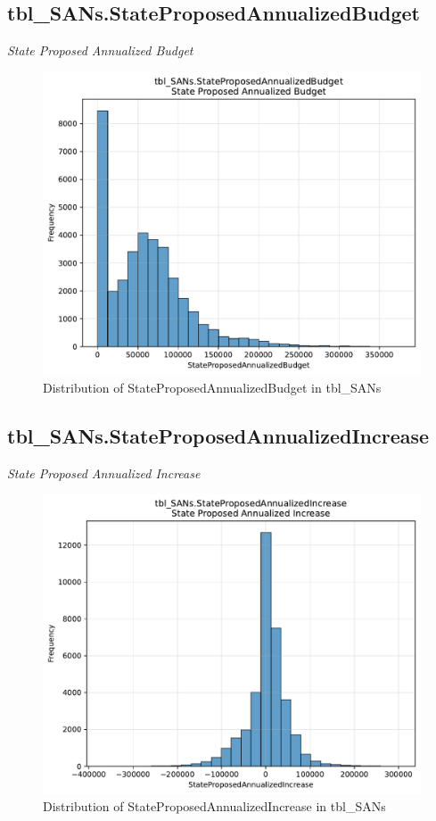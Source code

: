\subsection{tbl\_SANs.StateProposedAnnualizedBudget}
\textit{State Proposed Annualized Budget}

\begin{figure}[htbp]
\centering
\includegraphics[width=\textwidth]{figures/dbo_tbl_SANs_StateProposedAnnualizedBudget.pdf}
\caption{Distribution of StateProposedAnnualizedBudget in tbl\_SANs}
\end{figure}\newpage

\subsection{tbl\_SANs.StateProposedAnnualizedIncrease}
\textit{State Proposed Annualized Increase}

\begin{figure}[htbp]
\centering
\includegraphics[width=\textwidth]{figures/dbo_tbl_SANs_StateProposedAnnualizedIncrease.pdf}
\caption{Distribution of StateProposedAnnualizedIncrease in tbl\_SANs}
\end{figure}\newpage

